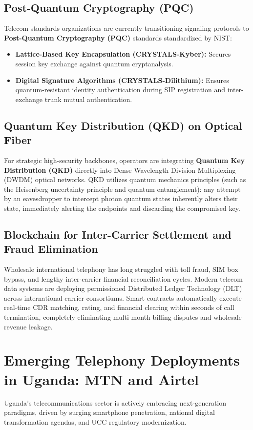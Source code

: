 \documentclass[12pt,a4paper]{report}
\begin{document}
\subsection{Post-Quantum Cryptography (PQC)}
Telecom standards organizations are currently transitioning signaling protocols to \textbf{Post-Quantum Cryptography (PQC)} standards standardized by NIST:
\begin{itemize}
    \item \textbf{Lattice-Based Key Encapsulation (CRYSTALS-Kyber):} Secures session key exchange against quantum cryptanalysis.
    \item \textbf{Digital Signature Algorithms (CRYSTALS-Dilithium):} Ensures quantum-resistant identity authentication during SIP registration and inter-exchange trunk mutual authentication.
\end{itemize}

\subsection{Quantum Key Distribution (QKD) on Optical Fiber}
For strategic high-security backbones, operators are integrating \textbf{Quantum Key Distribution (QKD)} directly into Dense Wavelength Division Multiplexing (DWDM) optical networks. QKD utilizes quantum mechanics principles (such as the Heisenberg uncertainty principle and quantum entanglement): any attempt by an eavesdropper to intercept photon quantum states inherently alters their state, immediately alerting the endpoints and discarding the compromised key.

\subsection{Blockchain for Inter-Carrier Settlement and Fraud Elimination}
Wholesale international telephony has long struggled with toll fraud, SIM box bypass, and lengthy inter-carrier financial reconciliation cycles. Modern telecom data systems are deploying permissioned Distributed Ledger Technology (DLT) across international carrier consortiums. Smart contracts automatically execute real-time CDR matching, rating, and financial clearing within seconds of call termination, completely eliminating multi-month billing disputes and wholesale revenue leakage.

\section{Emerging Telephony Deployments in Uganda: MTN and Airtel}
Uganda's telecommunications sector is actively embracing next-generation paradigms, driven by surging smartphone penetration, national digital transformation agendas, and UCC regulatory modernization.
\end{document}

